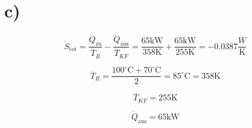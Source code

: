 

\section*{c)}
\[
\dot{S}_{\text{tot}} = \frac{\dot{Q}_{\text{zu}}}{\overline{T}_{R}} - \frac{\dot{Q}_{\text{aus}}}{\overline{T}_{KF}} = \frac{65 \text{kW}}{358 \text{K}} + \frac{65 \text{kW}}{255 \text{K}} = -0.0387 \frac{\dot{W}}{\text{K}}
\]

\[
\overline{T}_{R} = \frac{100^\circ \text{C} + 70^\circ \text{C}}{2} = 85^\circ \text{C} = 358 \text{K}
\]

\[
\overline{T}_{KF} = 255 \text{K}
\]

\[
\dot{Q}_{\text{aus}} = 65 \text{kW}
\]